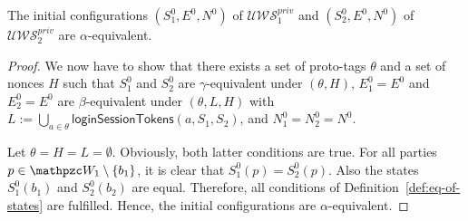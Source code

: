   \begin{lemma}\label{lemma:initial-config-private}
    The initial configurations $(S_1^0,E^0,N^0)$ of 
    $\mathcal{U\!W\!S}^{priv}_1$ and $(S_2^0,E^0,N^0)$ of 
    $\mathcal{U\!W\!S}^{priv}_2$ are $\alpha$-equivalent.
  \end{lemma}
  \begin{proof}
    We now have to show that there exists a set of proto-tags $\theta$ and a set of nonces $H$
    such that $S_1^0$ and $S_2^0$ are $\gamma$-equivalent under
    $(\theta,H)$, $E_1^0 = E^0$ and $E_2^0 = E^0$ are $\beta$-equivalent
    under $(\theta,L,H)$ with $L := \bigcup_{a\in\theta} \mathsf{loginSessionTokens}(a,S_1,S_2)$, and $N_1^0 = N_2^0 = N^0$.
  
    Let $\theta = H = L = \emptyset$. Obviously, both latter conditions are
    true. For all parties $p \in \bidsystem_1 \setminus \{b_1\}$, it is
    clear that $S_1^0(p) = S_2^0(p)$. Also the states $S_1^0(b_1)$ and
    $S_2^0(b_2)$ are equal. Therefore, all conditions
    of Definition~\ref{def:eq-of-states} are fulfilled. Hence, the
    initial configurations are $\alpha$-equivalent.
  \end{proof}
  

